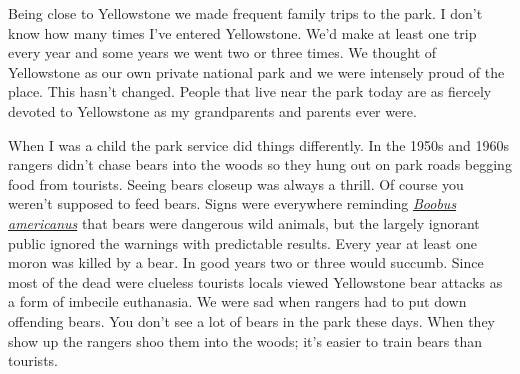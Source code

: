 Being close to Yellowstone we made frequent family trips to the park. I
don't know how many times I've entered Yellowstone. We'd make at least
one trip every year and some years we went two or three times. We
thought of Yellowstone as our own private national park and we were
intensely proud of the place. This hasn't changed. People that live near
the park today are as fiercely devoted to Yellowstone as my grandparents
and parents ever were.

When I was a child the park service did things differently. In the
1950s and 1960s rangers didn't chase bears into the woods so they hung
out on park roads begging food from tourists. Seeing bears closeup was
always a thrill. Of course you weren't supposed to feed bears. Signs
were everywhere reminding
\href{http://www.urbandictionary.com/define.php?term=Boobus\%20Americanus}{\emph{Boobus
americanus}} that bears were dangerous wild animals, but the largely
ignorant public ignored the warnings with predictable results. Every
year at least one moron was killed by a bear. In good years two or three
would succumb. Since most of the dead were clueless tourists locals
viewed Yellowstone bear attacks as a form of imbecile euthanasia. We
were sad when rangers had to put down offending bears. You don't see a
lot of bears in the park these days. When they show up the rangers shoo
them into the woods; it's easier to train bears than tourists.




